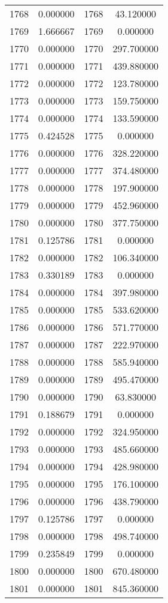 \documentclass[12pt]{article}
\begin{document}
\begin{longtable}{@{}cccc@{}}
1768 & 0.000000 & 1768 & 43.120000 \\
1769 & 1.666667 & 1769 & 0.000000 \\
1770 & 0.000000 & 1770 & 297.700000 \\
1771 & 0.000000 & 1771 & 439.880000 \\
1772 & 0.000000 & 1772 & 123.780000 \\
1773 & 0.000000 & 1773 & 159.750000 \\
1774 & 0.000000 & 1774 & 133.590000 \\
1775 & 0.424528 & 1775 & 0.000000 \\
1776 & 0.000000 & 1776 & 328.220000 \\
1777 & 0.000000 & 1777 & 374.480000 \\
1778 & 0.000000 & 1778 & 197.900000 \\
1779 & 0.000000 & 1779 & 452.960000 \\
1780 & 0.000000 & 1780 & 377.750000 \\
1781 & 0.125786 & 1781 & 0.000000 \\
1782 & 0.000000 & 1782 & 106.340000 \\
1783 & 0.330189 & 1783 & 0.000000 \\
1784 & 0.000000 & 1784 & 397.980000 \\
1785 & 0.000000 & 1785 & 533.620000 \\
1786 & 0.000000 & 1786 & 571.770000 \\
1787 & 0.000000 & 1787 & 222.970000 \\
1788 & 0.000000 & 1788 & 585.940000 \\
1789 & 0.000000 & 1789 & 495.470000 \\
1790 & 0.000000 & 1790 & 63.830000 \\
1791 & 0.188679 & 1791 & 0.000000 \\
1792 & 0.000000 & 1792 & 324.950000 \\
1793 & 0.000000 & 1793 & 485.660000 \\
1794 & 0.000000 & 1794 & 428.980000 \\
1795 & 0.000000 & 1795 & 176.100000 \\
1796 & 0.000000 & 1796 & 438.790000 \\
1797 & 0.125786 & 1797 & 0.000000 \\
1798 & 0.000000 & 1798 & 498.740000 \\
1799 & 0.235849 & 1799 & 0.000000 \\
1800 & 0.000000 & 1800 & 670.480000 \\
1801 & 0.000000 & 1801 & 845.360000 \\

\end{longtable}
\end{document}
